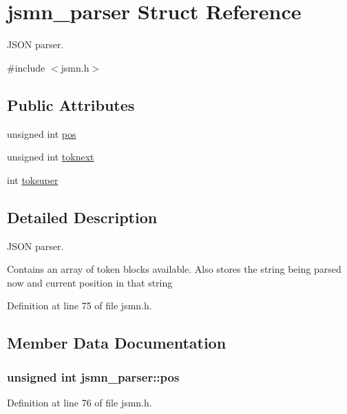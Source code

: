 \hypertarget{structjsmn__parser}{\section{jsmn\-\_\-parser Struct Reference}
\label{structjsmn__parser}
}


J\-S\-O\-N parser.  




{\ttfamily \#include $<$jsmn.\-h$>$}

\subsection*{Public Attributes}
\begin{DoxyCompactItemize}
\item 
unsigned int \hyperlink{structjsmn__parser_a3d0d6e48d3d5b24262f9e0c2241dc456}{pos}
\item 
unsigned int \hyperlink{structjsmn__parser_af640efd7d154218124a964b65f114bff}{toknext}
\item 
int \hyperlink{structjsmn__parser_af11fcec48d9f1298909777a12f1d1e39}{toksuper}
\end{DoxyCompactItemize}


\subsection{Detailed Description}
J\-S\-O\-N parser. 

Contains an array of token blocks available. Also stores the string being parsed now and current position in that string 

Definition at line 75 of file jsmn.\-h.



\subsection{Member Data Documentation}
\hypertarget{structjsmn__parser_a3d0d6e48d3d5b24262f9e0c2241dc456}{
\subsubsection[{pos}]{\setlength{\rightskip}{0pt plus 5cm}unsigned int jsmn\-\_\-parser\-::pos}}\label{structjsmn__parser_a3d0d6e48d3d5b24262f9e0c2241dc456}


Definition at line 76 of file jsmn.\-h.

